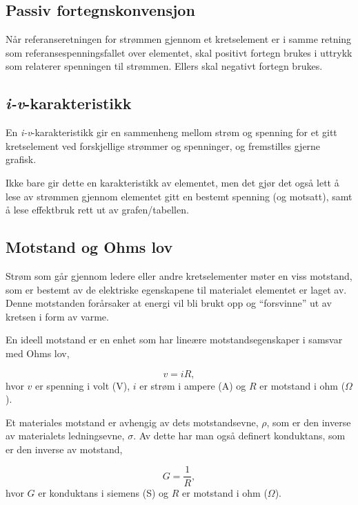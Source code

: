 \documentclass[norsk, a4paper, 12pt, twoside, titlepage]{article}
\begin{document}
\subsection{Passiv fortegnskonvensjon}
Når referanseretningen for strømmen gjennom et kretselement er i samme
retning som referansespenningsfallet over elementet, skal positivt
fortegn brukes i uttrykk som relaterer spenningen til strømmen.
Ellers skal negativt fortegn brukes.

\subsection{\emph{i-v}-karakteristikk}
En \emph{i-v}-karakteristikk gir en sammenheng mellom strøm og spenning for
et gitt kretselement ved forskjellige strømmer og spenninger, og
fremstilles gjerne grafisk.

Ikke bare gir dette en karakteristikk av elementet, men det gjør det
også lett å lese av strømmen gjennom elementet gitt en bestemt spenning
(og motsatt), samt å lese effektbruk rett ut av grafen/tabellen.


\subsection{Motstand og Ohms lov}
\label{Ohms_lov}
Strøm som går gjennom ledere eller andre kretselementer møter en viss
motstand, som er bestemt av de elektriske egenskapene til materialet
elementet er laget av. Denne motstanden forårsaker at energi vil bli
brukt opp og ``forsvinne'' ut av kretsen i form av varme.

En ideell motstand er en enhet som har lineære motstandsegenskaper i
samsvar med Ohms lov,

\begin{equation}
v = iR,
\end{equation}
hvor $v$ er spenning i volt (V), $i$ er strøm i ampere (A) og $R$ er
motstand i ohm ($\Omega$).


Et materiales motstand er avhengig av dets 
motstandsevne, $\rho$, som er den inverse av materialets
ledningsevne, $\sigma$. Av dette har man også
definert konduktans, som er den inverse av motstand,

\begin{equation}
G = \frac{1}{R},
\end{equation}
hvor $G$ er konduktans i siemens (S) og $R$ er motstand i ohm ($\Omega$).
\end{document}
